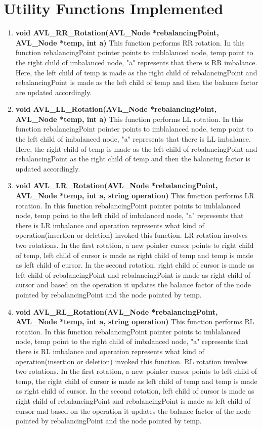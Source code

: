 \documentclass[12pt]{article}
\begin{document}
\section{Utility Functions Implemented}
    \begin{enumerate}
        \item \textbf{void AVL\_RR\_Rotation(AVL\_Node *rebalancingPoint, AVL\_Node *temp, int a)}\newline
       This function performs RR rotation. In this function rebalancingPoint pointer points to imblalanced node, temp point to the right child of imbalanced node, "a" represents that there is RR imbalance. Here, the left child of temp is made as the right child of rebalancingPoint and rebalancingPoint is made as the left child of temp and then the balance factor are updated accordingly. 
        \item \textbf{void AVL\_LL\_Rotation(AVL\_Node *rebalancingPoint, AVL\_Node *temp, int a)}\newline
        This function performs LL rotation. In this function rebalancingPoint pointer points to imblalanced node, temp point to the left child of imbalanced node, "a" represents that there is LL imbalance. Here, the right child of temp is made as the left child of rebalancingPoint and rebalancingPoint as the right child of temp and then the balancing factor is updated accordingly.
        \item \textbf{void AVL\_LR\_Rotation(AVL\_Node *rebalancingPoint, AVL\_Node *temp, int a, string operation)}\newline
        This function performs LR rotation. In this function rebalancingPoint pointer points to imblalanced node, temp point to the left child of imbalanced node, "a" represents that there is LR imbalance and operation represents what kind of operation(insertion or deletion) invoked this function. LR rotation involves two rotations. In the first rotation, a new pointer cursor points to right child of temp, left child of cursor is made as right child of temp and temp is made as left child of cursor. In the second rotation, right child of cursor is made as left child of rebalancingPoint and rebalancingPoint is made as right child of cursor and based on the operation it updates the balance factor of the node pointed by rebalancingPoint and the node pointed by temp.
        \item \textbf{void AVL\_RL\_Rotation(AVL\_Node *rebalancingPoint, AVL\_Node *temp, int a, string operation)}\newline
        This function performs RL rotation. In this function rebalancingPoint pointer points to imblalanced node, temp point to the right child of imbalanced node, "a" represents that there is RL imbalance and operation represents what kind of operation(insertion or deletion) invoked this function. RL rotation involves two rotations. In the first rotation, a new pointer cursor points to left child of temp, the right child of cursor is made as left child of temp and temp is made as right child of cursor. In the second rotation, left child of cursor is made as right child of rebalancingPoint and rebalancingPoint is made as left child of cursor and based on the operation it updates the balance factor of the node pointed by rebalancingPoint and the node pointed by temp.

\end{enumerate}
\end{document}
